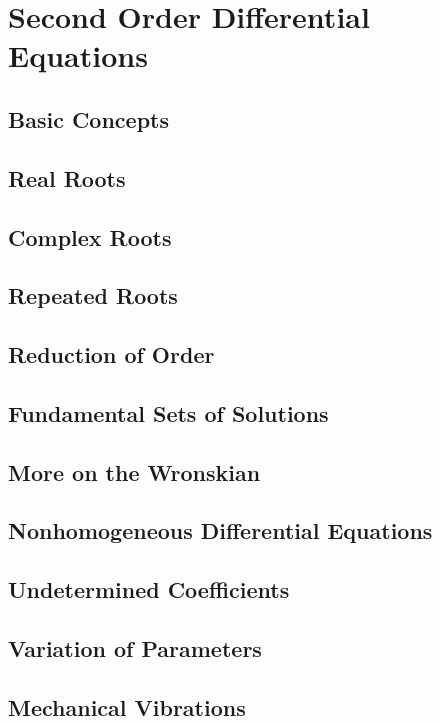 \documentclass[../satmath.tex]{subfiles}
\begin{document}
\chapter{Second Order Differential Equations}
\section{Basic Concepts}
\section{Real Roots}
\section{Complex Roots}
\section{Repeated Roots}
\section{Reduction of Order}
\section{Fundamental Sets of Solutions}
\section{More on the Wronskian}
\section{Nonhomogeneous Differential Equations}
\section{Undetermined Coefficients}
\section{Variation of Parameters}
\section{Mechanical Vibrations}
\end{document}
